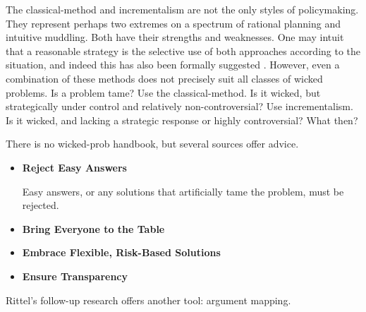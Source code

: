 The \ac{classical-method} and \ac{incrementalism} are not the only styles of policymaking. They represent perhaps two
extremes on a spectrum of rational planning and intuitive muddling. Both have their strengths and weaknesses. One may
intuit that a reasonable strategy is the selective use of both approaches according to the situation, and indeed this
has also been formally suggested \cite{etzioni_scanning_1967}. However, even a combination of these methods does not
precisely suit all classes of wicked problems. Is a problem tame? Use the \ac{classical-method}. Is it wicked, but
strategically under control and relatively non-controversial? Use \ac{incrementalism}. Is it wicked, and lacking a
strategic response or highly controversial? What then?

There is no \ac{wicked-prob} handbook, but several sources offer advice.

\newcommand{\wickedtipsstart}{\begin{itemize}}
\newcommand{\wickedtip}[2]{ %
  \item \textbf{#1} \nopagebreak

  \vspace{0.5\baselineskip} \parbox{\linewidth}{#2} \vspace{0.5\baselineskip}
}
\newcommand{\wickedtipsend}{\end{itemize}}

\wickedtipsstart

  \wickedtip{Reject Easy Answers}{

Easy answers, or any solutions that artificially tame the problem, must be rejected.

}

  \wickedtip{Bring Everyone to the Table}{
}

  \wickedtip{Embrace Flexible, Risk-Based Solutions}{
}

  \wickedtip{Ensure Transparency}{
}

\wickedtipsend

Rittel's follow-up research offers another tool: argument mapping.



